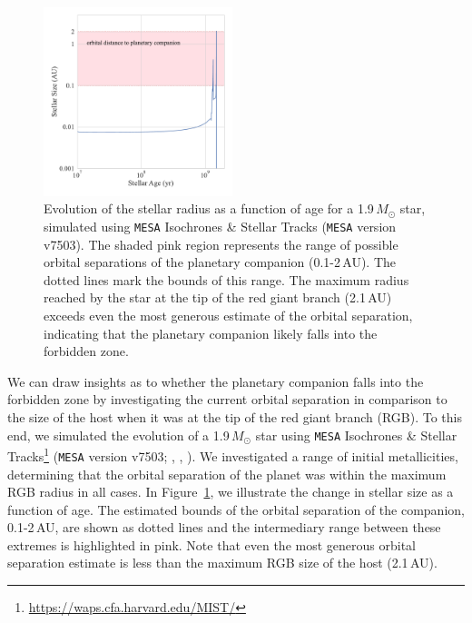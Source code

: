 \documentclass[twocolumn]{aastex631}
\begin{document}
\begin{figure}[h]
\centering
\includegraphics[width=0.49\textwidth]{Figures/WD0310-688.pdf}
\caption{Evolution of the stellar radius as a function of age for a 1.9\,$M_{\odot}$ star, simulated using \texttt{MESA} Isochrones \& Stellar Tracks (\texttt{MESA} version v7503). The shaded pink region represents the range of possible orbital separations of the planetary companion (0.1-2\,AU). The dotted lines mark the bounds of this range. The maximum radius reached by the star at the tip of the red giant branch (2.1\,AU) exceeds even the most generous estimate of the orbital separation, indicating that the planetary companion likely falls into the forbidden zone.}
\label{fig:size}
\end{figure}


We can draw insights as to whether the planetary companion falls into the forbidden zone by investigating the current orbital separation in comparison to the size of the host when it was at the tip of the red giant branch (RGB). To this end, we simulated the evolution of a 1.9\,$M_{\odot}$ star using \texttt{MESA} Isochrones \& Stellar Tracks\footnote{\url{https://waps.cfa.harvard.edu/MIST/}} (\texttt{MESA} version v7503; \citealt{Dotter2016}, \citealt{Choi2016}, \citealt{Paxton2011,Paxton2013, Paxton2015}). We investigated a range of initial metallicities, determining that the orbital separation of the planet was within the maximum RGB radius in all cases. In Figure~\ref{fig:size}, we illustrate the change in stellar size as a function of age. The estimated bounds of the orbital separation of the companion, 0.1-2\,AU, are shown as dotted lines and the intermediary range between these extremes is highlighted in pink. Note that even the most generous orbital separation estimate is less than the maximum RGB size of the host (2.1\,AU).




{}

\end{document}
